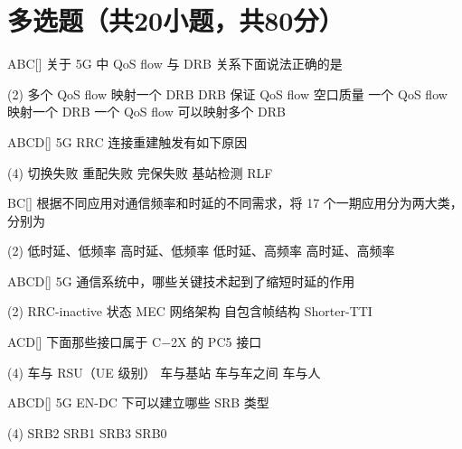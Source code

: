 \section{多选题（共20小题，共80分）}

\begin{choice}{\;ABC\;}[]
    关于 5G 中 QoS flow 与 DRB 关系下面说法正确的是
    \begin{tasks}(2)
        \task 多个 QoS flow 映射一个 DRB
        \task DRB 保证 QoS flow 空口质量
        \task 一个 QoS flow 映射一个 DRB
        \task 一个 QoS flow 可以映射多个 DRB
    \end{tasks}
\end{choice}



\begin{choice}{\;ABCD\;}[]
    5G RRC 连接重建触发有如下原因
    \begin{tasks}(4)
        \task 切换失败
        \task 重配失败
        \task 完保失败
        \task 基站检测 RLF
    \end{tasks}
\end{choice}


\begin{choice}{\;BC\;}[]
    根据不同应用对通信频率和时延的不同需求，将 17 个一期应用分为两大类，分别为
    \begin{tasks}(2)
        \task 低时延、低频率
        \task 高时延、低频率
        \task 低时延、高频率
        \task 高时延、高频率
    \end{tasks}
\end{choice}

\begin{choice}{\;ABCD\;}[]
    5G 通信系统中，哪些关键技术起到了缩短时延的作用
    \begin{tasks}(2)
        \task RRC-inactive 状态
        \task MEC 网络架构
        \task 自包含帧结构
        \task Shorter-TTI
    \end{tasks}
\end{choice}

\begin{choice}{\;ACD\;}[]
    下面那些接口属于 C−2X 的 PC5 接口
    \begin{tasks}(4)
        \task 车与 RSU（UE 级别）
        \task 车与基站
        \task 车与车之间
        \task 车与人
    \end{tasks}
\end{choice}

\begin{choice}{\;ABCD\;}[]
    5G EN-DC 下可以建立哪些 SRB 类型
    \begin{tasks}(4)
        \task  SRB2
        \task SRB1
        \task SRB3
        \task SRB0
    \end{tasks}
\end{choice}


